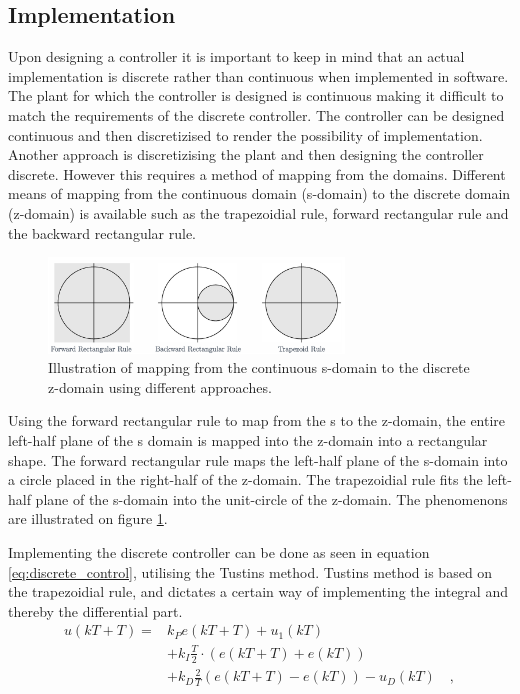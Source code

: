 \documentclass[../../main.tex]{subfiles}
\begin{document}
\subsection*{Implementation}
Upon designing a controller it is important to keep in mind that an actual implementation is discrete rather than continuous when implemented in software. The plant for which the controller is designed is continuous making it difficult to match the requirements of the discrete controller. The controller can be designed continuous and then discretizised to render the possibility of implementation. Another approach is discretizising the plant and then designing the controller discrete. However this requires a method of mapping from the domains. Different means of mapping from the continuous domain (s-domain) to the discrete domain (z-domain) is available such as the trapezoidial rule, forward rectangular rule and the backward rectangular rule. 
\begin{figure}
    \centering
    \includegraphics[width = 0.7\textwidth]{Sections/Miscellaneous/Images/Trapezoid_rule.jpeg}
    \caption{Illustration of mapping from the continuous s-domain to the discrete z-domain using different approaches.}
    \label{fig:mapping_s_to_z}
\end{figure}
Using the forward rectangular rule to map from the s to the z-domain, the entire left-half plane of the s domain is mapped into the z-domain into a rectangular shape. The forward rectangular rule maps the left-half plane of the s-domain into a circle placed in the right-half of the z-domain. The trapezoidial rule fits the left-half plane of the s-domain into the unit-circle of the z-domain. The phenomenons are illustrated on figure \ref{fig:mapping_s_to_z}.  

Implementing the discrete controller can be done as seen in equation \ref{eq:discrete_control}, utilising the Tustins method. Tustins method is based on the trapezoidial rule, and dictates a certain way of implementing the integral and thereby the differential part.
\begin{equation}\label{eq:discrete_control}
\begin{split}
        u(kT+T)=&k_Pe(kT+T)+u_1(kT)\\ &+ k_I\frac{T}{2} \cdot (e(kT+T)+e(kT))\\ &+k_D \frac{2}{T}(e(kT+T)-e(kT))-u_D(kT) \quad ,
\end{split}
\end{equation}
\end{document}
